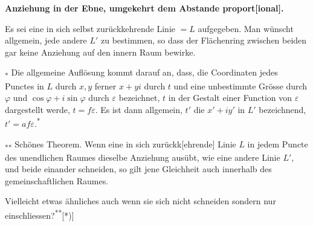 \begingroup
\makeatletter\tagsleft@true\let\veqno\@@leqno\makeatother
\clearpage{}\NoSourceHead
{}
\noindent {\small[S 172]}
\begin{center}\bfseries Anziehung in der Ebne, umgekehrt dem Abstande proport[ional].\end{center}
\par\indent Es sei eine in sich selbst zurückkehrende Linie $=L$ aufgegeben. Man wünscht allgemein, jede andere $L'$ zu bestimmen, so dass der Flächenring zwischen beiden gar keine Anziehung auf den innern Raum bewirke.
\par\indent\textsubscript{*} Die allgemeine Auflösung kommt darauf an, dass, die Coordinaten jedes Punctes in $L$ durch $x,y$ ferner $x+yi$ durch $t$ und eine unbestimmte Grösse durch $\varphi$ und $\cos\varphi+i\sin\varphi$ durch $\varepsilon$ bezeichnet, $t$ in der Gestalt einer Function von $\varepsilon$ dargestellt werde, $t=f\varepsilon$. Es ist dann allgemein, $t'$ die $x'+iy'$ in $L'$ bezeichnend, $t'=af\varepsilon$.\textsuperscript{*}
\par\medskip\noindent
\begin{minipage}[c]{.25\linewidth}\centering
{}
\end{minipage}\hfill
\begin{minipage}[c]{.70\linewidth}
\setlength{\parindent}{1.2em}
\par\indent\textsubscript{**} Schönes Theorem. Wenn eine in sich zurückk[ehrende] Linie $L$ in jedem Puncte des unendlichen Raumes dieselbe Anziehung ausübt, wie eine andere Linie $L'$, und beide einander schneiden, so gilt jene Gleichheit auch innerhalb des gemeinschaftlichen Raumes.
\end{minipage}
\par\medskip\noindent
\begin{minipage}[c]{.70\linewidth}
\setlength{\parindent}{1.2em}
\par\indent Vielleicht etwas ähnliches auch wenn sie sich nicht schneiden sondern nur einschliessen?\textsuperscript{**}[*)]
\end{minipage}\hfill
